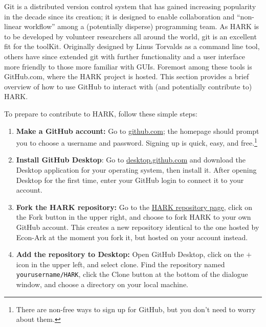 \documentclass[12pt,titlepage,letterpaper]{econtex}
\begin{document}
Git is a distributed version control system that has gained increasing popularity in the decade since its creation; it is designed to enable collaboration and ``non-linear workflow'' among a (potentially disperse) programming team.  As HARK is to be developed by volunteer researchers all around the world, git is an excellent fit for the toolKit.  Originally designed by Linus Torvalds as a command line tool, others have since extended git with further functionality and a user interface more friendly to those more familiar with GUIs.  Foremost among these tools is GitHub.com, where the HARK project is hosted.  This section provides a brief overview of how to use GitHub to interact with (and potentially contribute to) HARK.

To prepare to contribute to HARK, follow these simple steps:
\begin{enumerate}
\item \textbf{Make a GitHub account:} Go to \href{https://www.github.com}{github.com}; the homepage should prompt you to choose a username and password.  Signing up is quick, easy, and free.\footnote{There are non-free ways to sign up for GitHub, but you don't need to worry about them.}

\item \textbf{Install GitHub Desktop}: Go to \href{https://desktop.github.com/}{desktop.github.com} and download the Desktop application for your operating system, then install it.  After opening Desktop for the first time, enter your GitHub login to connect it to your account.

\item \textbf{Fork the HARK repository:} Go to the \href{https://github.com/econ-ark/HARK}{HARK repository page}, click on the Fork button in the upper right, and choose to fork HARK to your own GitHub account.  This creates a new repository identical to the one hosted by Econ-Ark at the moment you fork it, but hosted on your account instead.

\item \textbf{Add the repository to Desktop:} Open GitHub Desktop, click on the $+$ icon in the upper left, and select clone.  Find the repository named \texttt{yourusername/HARK}, click the Clone button at the bottom of the dialogue window, and choose a directory on your local machine.
\end{enumerate}
\end{document}
